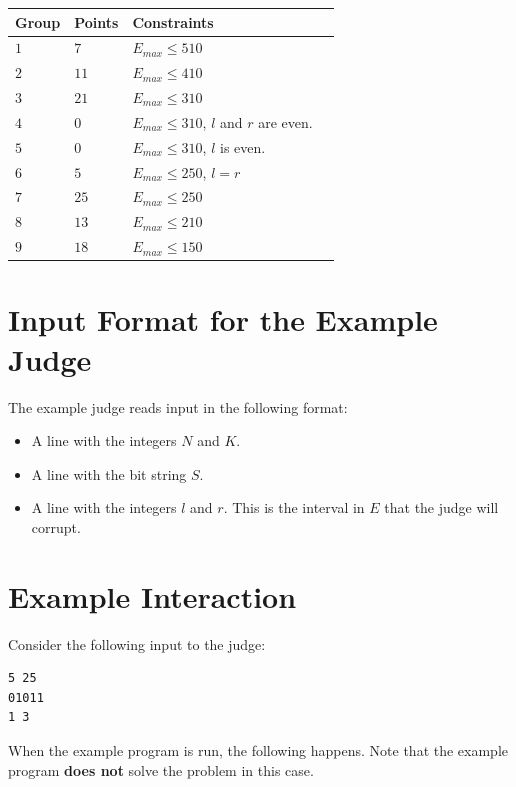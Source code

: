 \noindent
\begin{tabular}{| l | l | l | l |}
  \hline
  \textbf{Group} & \textbf{Points} & \textbf{Constraints} \\ \hline
  $1$   & $7$        & $E_{max} \leq 510$ \\ \hline
  $2$   & $11$       & $E_{max} \leq 410$ \\ \hline
  $3$   & $21$       & $E_{max} \leq 310$ \\ \hline
  $4$   & $0$        & $E_{max} \leq 310$, $l$ and $r$ are even. \\ \hline
  $5$   & $0$        & $E_{max} \leq 310$, $l$ is even. \\ \hline
  $6$   & $5$        & $E_{max} \leq 250$, $l=r$ \\ \hline
  $7$   & $25$       & $E_{max} \leq 250$ \\ \hline
  $8$   & $13$       & $E_{max} \leq 210$ \\ \hline
  $9$   & $18$       & $E_{max} \leq 150$ \\ \hline
\end{tabular}

\section*{Input Format for the Example Judge}
The example judge reads input in the following format:
\begin{itemize}
  \item A line with the integers $N$ and $K$.
  \item A line with the bit string $S$.
  \item A line with the integers $l$ and $r$. This is the interval in $E$ that the judge will corrupt.
\end{itemize}


\section*{Example Interaction}

Consider the following input to the judge:
\begin{verbatim}
5 25
01011
1 3
\end{verbatim}

When the example program is run, the following happens. Note that the example program \textbf{does not} solve the
problem in this case.


